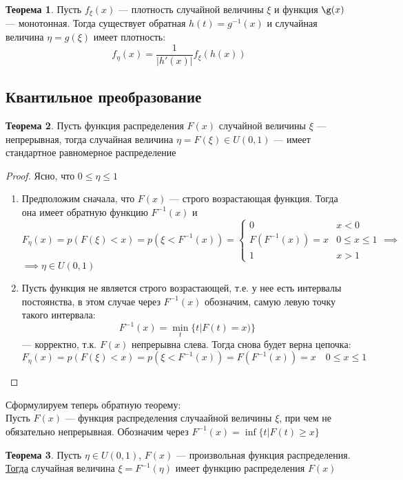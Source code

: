 \documentclass[english]{article}
\theoremstyle{plain}
\theoremstyle{remark}
\theoremstyle{definition}
\newtheorem{theorem}{Теорема}[section]
\begin{document}
\begin{theorem}
Пусть \(f_\xi(x)\) --- плотность случайной величины \(\xi\) и функция \(\g(x)\) --- монотонная. Тогда существует обратная \(h(t) = g^{-1}(x)\) и случайная величина \(\eta = g(\xi)\) имеет плотность:
\[ f_\eta(x) = \frac{1}{|h'(x)|} f _\xi(h(x)) \]
\end{theorem}
\subsection{Квантильное преобразование}
\label{sec:org1b9839a}
\begin{theorem}
Пусть функция распределения \(F(x)\) случайной величины \(\xi\) --- непрерывная, тогда случайная величина \(\eta = F(\xi) \in U(0, 1)\) --- имеет стандартное равномерное распределение
\end{theorem}
\begin{proof}
Ясно, что \(0 \le \eta \le 1\)
\begin{enumerate}
\item Предположим сначала, что \(F(x)\) --- строго возрастающая функция. Тогда она имеет обратную функцию \(F^{-1}(x)\) и
\[ F_\eta(x) = p(F(\xi) < x) = p(\xi < F^{-1}(x)) = \begin{cases}
   0 & x < 0 \\
   F(F^{-1}(x)) = x & 0 \le x \le 1 \\
   1 & x > 1
   \end{cases} \implies \]
\(\implies \eta \in U(0, 1)\)
\item Пусть функция не является строго возрастающей, т.е. у нее есть интервалы постоянства, в этом случае через \(F^{-1}(x)\) обозначим, самую левую точку такого интервала:
\[ F^{-1}(x) = \min_t\{t \Big| F(t) = x)\} \]
--- корректно, т.к. \(F(x)\) непрерывна слева. Тогда снова будет верна цепочка:
\[ F_\eta(x) = p(F(\xi) < x) = p(\xi < F^{-1}(x)) = F(F^{-1}(x)) = x\quad 0 \le x \le 1\]
\end{enumerate}
\end{proof}
Сформулируем теперь обратную теорему: \\
Пусть \(F(x)\) --- функция распределения случаайной величины \(\xi\), при чем не обязательно непрерывная. Обозначим через \(F^{-1}(x) = \inf\{t \Big| F(t) \ge x\}\)
\begin{theorem}
Пусть \(\eta \in U(0, 1)\), \(F(x)\) --- произвольная функция распределения. \\
\uline{Тогда} случайная величина \(\xi = F^{-1}(\eta)\) имеет функцию распределения \(F(x)\)
\end{theorem}
\end{document}
